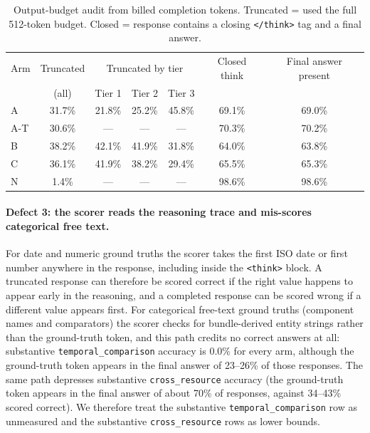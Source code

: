 \begin{table}[htbp]
\centering
\caption{Output-budget audit from billed completion tokens.  Truncated = used the full
512-token budget.  Closed = response contains a closing \texttt{</think>} tag and a final
answer.}
\label{tab:budget_audit}
\begin{tabular}{lcccccc}
\toprule
Arm & Truncated & \multicolumn{3}{c}{Truncated by tier} & Closed think & Final answer present \\
    & (all)     & Tier 1 & Tier 2 & Tier 3 &             &  \\
\midrule
A   & 31.7\% & 21.8\% & 25.2\% & 45.8\% & 69.1\% & 69.0\% \\
A-T & 30.6\% & ---    & ---    & ---    & 70.3\% & 70.2\% \\
B   & 38.2\% & 42.1\% & 41.9\% & 31.8\% & 64.0\% & 63.8\% \\
C   & 36.1\% & 41.9\% & 38.2\% & 29.4\% & 65.5\% & 65.3\% \\
N   & 1.4\%  & ---    & ---    & ---    & 98.6\% & 98.6\% \\
\bottomrule
\end{tabular}
\end{table}

\paragraph{Defect 3: the scorer reads the reasoning trace and mis-scores categorical
free text.}
For date and numeric ground truths the scorer takes the first ISO date or first number
anywhere in the response, including inside the \texttt{<think>} block.  A truncated
response can therefore be scored correct if the right value happens to appear early in
the reasoning, and a completed response can be scored wrong if a different value appears
first.  For categorical free-text ground truths (component names and comparators) the
scorer checks for bundle-derived entity strings rather than the ground-truth token, and
this path credits no correct answers at all: substantive \texttt{temporal\_comparison}
accuracy is 0.0\% for every arm, although the ground-truth token appears in the final
answer of 23--26\% of those responses.  The same path depresses substantive
\texttt{cross\_resource} accuracy (the ground-truth token appears in the final answer of
about 70\% of responses, against 34--43\% scored correct).  We therefore treat the
substantive \texttt{temporal\_comparison} row as unmeasured and the substantive
\texttt{cross\_resource} rows as lower bounds.

